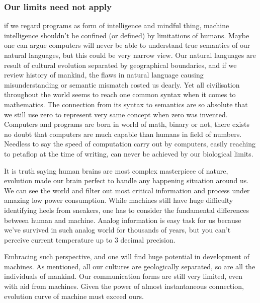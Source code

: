 \documentclass[11pt]{article}
\newenvironment{draft}{\color{dark-cornflower-blue-2}}{\ignorespacesafterend}
\begin{document}
\subsubsection*{Our limits need not apply}
\begin{draft}

if we regard programs  as form of intelligence and mindful thing, machine intelligence shouldn't be confined (or defined) by limitations of humans. Maybe one can argue computers will never be able to understand true semantics of our natural languages, but this could be very narrow view. Our natural languages are result of cultural evolution separated by geographical boundaries, and if we review history of mankind, the flaws in natural language causing misunderstanding or semantic mismatch costed us dearly. Yet all civilisation throughout the world seems to reach one common  syntax when it comes to mathematics. The connection from its syntax to semantics are so absolute that we still use zero to represent very same concept when zero was invented. Computers and programs are born in world of math, binary or not, there exists no doubt that computers are much capable than humans in field of numbers. Needless to say the speed of computation carry out by computers, easily reaching to petaflop at the time of writing, can never be achieved by our biological limits. 

It is truth saying human brains are most complex masterpiece of nature, evolution made our brain perfect to handle any happening situation around us. We can see the world and filter out most critical information and process under amazing low power consumption. While machines still have huge difficulty identifying heels from sneakers, one has to consider the fundamental differences between human and machine. Analog information is easy task for us because we've survived in such analog world for thousands of years, but you can't perceive current temperature up to 3 decimal precision. 

Embracing such perspective, and one will find huge potential in development of machines. As mentioned, all our cultures are geologically separated, so are all the individuals of mankind. Our communication forms are still very limited, even with aid from machines. Given the power of almost instantaneous connection, evolution curve of machine must exceed ours. 
\end{draft}

\end{document}

